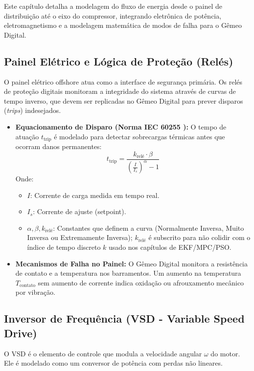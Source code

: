 \documentclass[12pt,a4paper]{article}
\numberwithin{equation}{section}
\numberwithin{table}{section}
\numberwithin{figure}{section}
\begin{document}
	Este capítulo detalha a modelagem do fluxo de energia desde o painel de distribuição até o eixo do compressor, integrando eletrônica de potência, eletromagnetismo e a modelagem matemática de modos de falha para o Gêmeo Digital.
	
	\subsection{\textbf{Painel Elétrico e Lógica de Proteção (Relés)}}
	O painel elétrico offshore atua como a interface de segurança primária. Os relés de proteção digitais monitoram a integridade do sistema através de curvas de tempo inverso, que devem ser replicadas no Gêmeo Digital para prever disparos (\textit{trips}) indesejados.
	
	\begin{itemize}
		\item \textbf{Equacionamento de Disparo (Norma IEC 60255 \cite{iec60255}):}
		O tempo de atuação $t_{\text{trip}}$ é modelado para detectar sobrecargas térmicas antes que ocorram danos permanentes:
		\begin{equation}\label{eq:s4-1}
 t_{\text{trip}} = \frac{k_{\text{relé}} \cdot \beta}{\left( \frac{I}{I_s} \right)^\alpha - 1} 
\end{equation}
		Onde:
		\begin{itemize}
			\item $I$: Corrente de carga medida em tempo real.
			\item $I_s$: Corrente de ajuste (setpoint).
			\item $\alpha, \beta, k_{\text{relé}}$: Constantes que definem a curva (Normalmente Inversa, Muito Inversa ou Extremamente Inversa); $k_{\text{relé}}$ é subscrito para não colidir com o índice de tempo discreto $k$ usado nos capítulos de EKF/MPC/PSO.
		\end{itemize}
		\item \textbf{Mecanismos de Falha no Painel:} O Gêmeo Digital monitora a resistência de contato e a temperatura nos barramentos. Um aumento na temperatura $T_{\text{contato}}$ sem aumento de corrente indica oxidação ou afrouxamento mecânico por vibração.
	\end{itemize}
	
	\subsection{\textbf{Inversor de Frequência (VSD - Variable Speed Drive)}}
	O VSD é o elemento de controle que modula a velocidade angular $\omega$ do motor. Ele é modelado como um conversor de potência com perdas não lineares.
	
\end{document}
